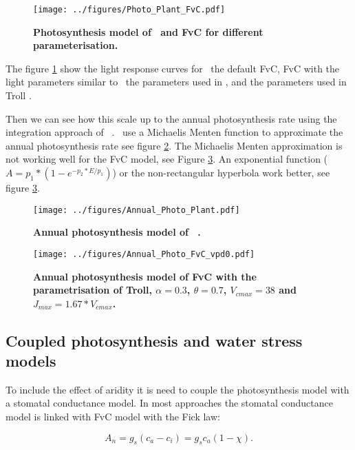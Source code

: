 \documentclass[a4paper,11pt]{article}
\begin{document}
\begin{figure}[ht]
\centering
\texttt{[image: ../figures/Photo\_Plant\_FvC.pdf]}
\caption{\textbf{Photosynthesis model of \plant\ and FvC for different parameterisation.}
\label{fig:photo}}
\end{figure}

The figure \ref{fig:photo} show the light response curves for \plant\, the default FvC, FvC with the light parameters similar to \plant\, the parameters used in \citet{Sterck-2011}, and the parameters used in Troll \citep{Marechaux-2017}.

Then we can see how this scale up to the annual photosynthesis rate using the integration approach of \plant\ . \plant\ use a Michaelis Menten function to approximate the annual photosynthesis rate see figure \ref{fig:photo_annu_plant}. The Michaelis Menten approximation is not working well for the FvC model, see Figure \ref{fig:photo_annu_fvc}. An exponential function \citep{Chen-2016} ($A = p_1 *(1-e^{-p_2* E/p_1})$) or the non-rectangular hyperbola work better, see figure \ref{fig:photo_annu_fvc}.


\begin{figure}[ht]
\centering
\texttt{[image: ../figures/Annual\_Photo\_Plant.pdf]}
\caption{\textbf{Annual photosynthesis model of \plant\ .}
\label{fig:photo_annu_plant}}
\end{figure}


\begin{figure}[ht]
\centering
\texttt{[image: ../figures/Annual\_Photo\_FvC\_vpd0.pdf]}
\caption{\textbf{Annual photosynthesis model of FvC with the parametrisation of Troll, $\alpha = 0.3$, $\theta = 0.7$, $V_{cmax} = 38$ and $J_{max} = 1.67 * V_{cmax}$.}
\label{fig:photo_annu_fvc}}
\end{figure}

\clearpage

\subsection{Coupled photosynthesis and water stress models}

To include the effect of aridity it is need to couple the photosynthesis model with a stomatal conductance model. In most approaches the stomatal conductance model is linked with FvC model with the Fick law:

\begin{equation}
\label{eq:fick}
A_n = g_s (c_a - c_i) = g_s c_a (1-\chi).
\end{equation}
\end{document}
